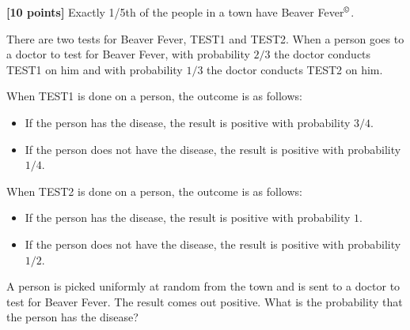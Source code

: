 \documentclass[12pt,oneside]{article}
\begin{document}
\begin{problem}
{\bf [10 points]}
Exactly 1/5th of the people in a town have Beaver Fever$^\copyright$.

There are two tests for Beaver Fever, TEST1 and TEST2.
When a person goes to a doctor to test for Beaver Fever, with probability
$2/3$ the doctor conducts TEST1 on him and with probability $1/3$
the doctor conducts TEST2 on him.

When TEST1 is done on a person, the outcome is as follows:
\begin{itemize}
\item If the person has the disease, the result is positive with probability
$3/4$.
\item If the person does not have the disease, the result is positive with probability
$1/4$.
\end{itemize}

When TEST2 is done on a person, the outcome is as follows:
\begin{itemize}
\item If the person has the disease, the result is positive with probability
$1$.
\item If the person does not have the disease, the result is positive with probability
$1/2$.
\end{itemize}


A person is picked uniformly at random from the town and is sent to
a doctor to test for Beaver Fever. The result comes out positive.
What is the probability that the person has the disease?

\end{problem}
\end{document}

